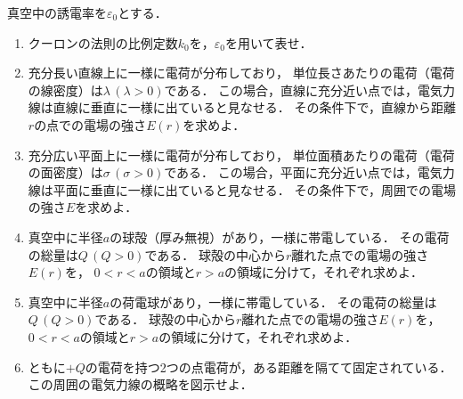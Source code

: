 \documentclass[../../../all/physics-standard_questions_all.tex]{subfiles}
\begin{document}
真空中の誘電率を$\varepsilon_0$とする．

\begin{enumerate}

    \item クーロンの法則の比例定数$k_0$を，$\varepsilon_0$を用いて表せ．
    
    \item 充分長い直線上に一様に電荷が分布しており，
    単位長さあたりの電荷（電荷の線密度）は$\lambda \, (\lambda>0)$である．
    この場合，直線に充分近い点では，電気力線は直線に垂直に一様に出ていると見なせる．
    その条件下で，直線から距離$r$の点での電場の強さ$E(r)$を求めよ．

    \item 充分広い平面上に一様に電荷が分布しており，
    単位面積あたりの電荷（電荷の面密度）は$\sigma \, (\sigma>0)$である．
    この場合，平面に充分近い点では，電気力線は平面に垂直に一様に出ていると見なせる．
    その条件下で，周囲での電場の強さ$E$を求めよ．

    \item 真空中に半径$a$の球殻（厚み無視）があり，一様に帯電している．
    その電荷の総量は$Q \, (Q>0)$である．
    球殻の中心から$r$離れた点での電場の強さ$E(r)$を，
    $0<r<a$の領域と$r>a$の領域に分けて，それぞれ求めよ．

    \item 真空中に半径$a$の荷電球があり，一様に帯電している．
    その電荷の総量は$Q \, (Q>0)$である．
    球殻の中心から$r$離れた点での電場の強さ$E(r)$を，
    $0<r<a$の領域と$r>a$の領域に分けて，それぞれ求めよ．

    \item ともに$+Q$の電荷を持つ2つの点電荷が，ある距離を隔てて固定されている．
    この周囲の電気力線の概略を図示せよ．

\end{enumerate}
\end{document}

